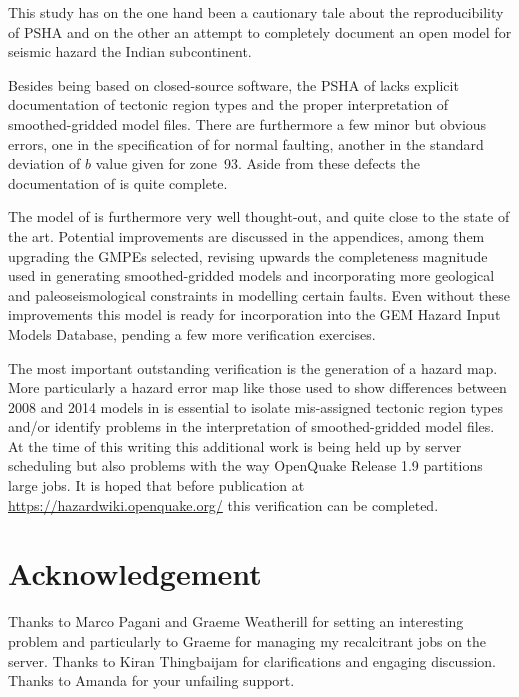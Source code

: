 \documentclass{article}
\begin{document}
This study has on the one hand been a cautionary tale about the reproducibility of PSHA and on the other an attempt to completely document an open model for seismic hazard the Indian subcontinent.

Besides being based on closed-source software, the PSHA of \cite{nath2012probabilistic} lacks explicit documentation of tectonic region types and the proper interpretation of smoothed-gridded model files. 
There are furthermore a few minor but obvious errors, one in the specification of \cite{sharma2009ground} for normal faulting, another in the standard deviation of $b$ value given for zone~93.
Aside from these defects the documentation of \cite{nath2012probabilistic} is quite complete.

The model of \cite{nath2012probabilistic} is furthermore very well thought-out, and quite close to the state of the art.
Potential improvements are discussed in the appendices, among them upgrading the GMPEs selected, revising upwards the completeness magnitude used in generating smoothed-gridded models and incorporating more geological and paleoseismological constraints in modelling certain faults.
Even without these improvements this model is ready for incorporation into the GEM Hazard Input Models Database, pending a few more verification exercises.

The most important outstanding verification is the generation of a hazard map.
More particularly a hazard error map like those used to show differences between 2008 and 2014 models in \cite{petersen2014documentation} is essential to isolate mis-assigned tectonic region types and/or identify problems in the interpretation of smoothed-gridded model files.
At the time of this writing this additional work is being held up by server scheduling but also problems with the way OpenQuake Release 1.9 partitions large jobs. 
It is hoped that before publication at \url{https://hazardwiki.openquake.org/} this verification can be completed.

\section*{Acknowledgement}
Thanks to Marco Pagani and Graeme Weatherill for setting an interesting problem and particularly to Graeme for managing my recalcitrant jobs on the server.
Thanks to Kiran Thingbaijam for clarifications and engaging discussion.
Thanks to Amanda for your unfailing support.

\cleardoublepage
{}
{}


\end{document}
